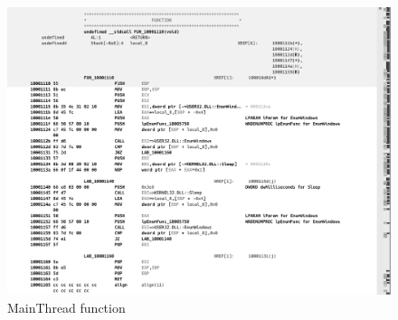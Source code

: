\begin{figure}[H]
    \centering
    \includegraphics[width=\linewidth]{./assets/takuzoo3868asset/ghidra_003_gray.png}
    \caption{MainThread function}
    \label{fig:ghdra_003}
\end{figure}

